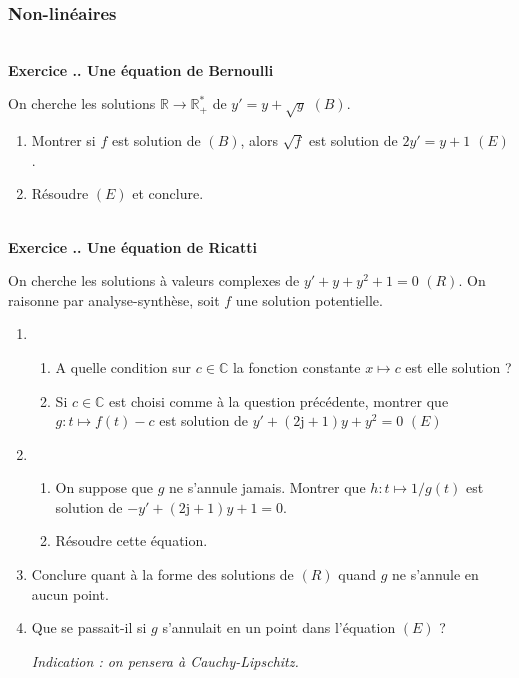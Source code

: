 \documentclass{article}
\newcommand{\mb}[1]{\mathbb{#1}}
\newcounter{exo}
\newcommand{\exercice}[1][\null]{\textbf{\\ Exercice \thesection.\theexo. #1} \addtocounter{exo}{1}}
\begin{document}
\subsubsection{Non-linéaires}

\exercice[Une équation de Bernoulli]

On cherche les solutions $\mb{R} \rightarrow \mb{R}_+^*$ de $y' = y +  \sqrt{y}$ $(B)$.

\begin{enumerate}

\item Montrer si $f$ est solution de $(B)$, alors $\sqrt{f}$ est solution de $2y' =  y + 1$ $(E)$.

\item Résoudre $(E)$ et conclure.

\end{enumerate}


\exercice[Une équation de Ricatti]

On cherche les solutions à valeurs complexes de $y' + y + y^2 + 1 = 0$ $(R)$. On raisonne par analyse-synthèse, soit $f$ une solution potentielle.

\begin{enumerate}

\item  \begin{enumerate}

\item A quelle condition sur $c \in \mb{C}$ la fonction constante $x \mapsto c$ est elle solution ?

\item Si $c \in \mb{C}$ est choisi comme à la question précédente, montrer que $g : t \mapsto f(t) -c$ est solution de $y' + (2\text{j} +1) y + y^2 = 0$ $(E)$

\end{enumerate}
 
\item \begin{enumerate}
\item On suppose que $g$ ne s'annule jamais. Montrer que $h : t \mapsto 1/g(t)$ est solution de $-y' + (2 \text{j}+1)y +1 = 0$.

\item Résoudre cette équation.

\end{enumerate}


\item Conclure quant à la forme des solutions de $(R)$ quand $g$ ne s'annule en aucun point.

\item Que se passait-il si $g$ s'annulait en un point dans l'équation $(E)$ ?

\emph{Indication : on pensera à Cauchy-Lipschitz.}
\end{enumerate}
\end{document}
